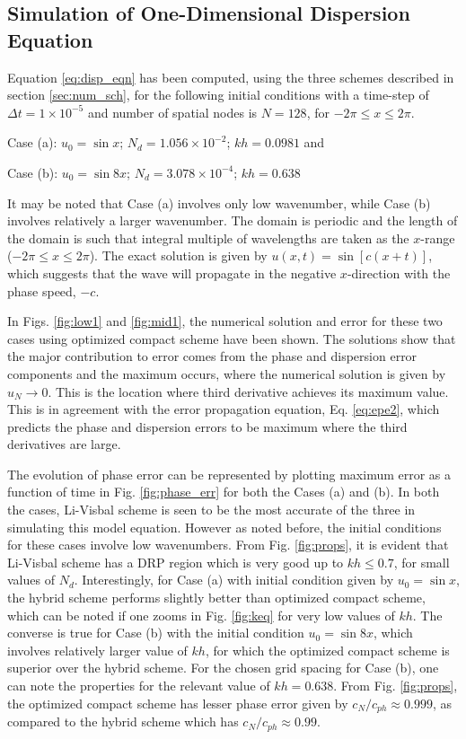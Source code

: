 \documentclass{svjour3}                    %
\begin{document}
\subsection{Simulation of One-Dimensional Dispersion Equation}
Equation \eqref{eq:disp_eqn} has been computed, using the three schemes described in section \ref{sec:num_sch}, for the following initial conditions with 
a time-step of $\Delta t =1 \times 10^{-5}$ and number of spatial nodes is $N=128$, for $-2\pi \leq x \leq 2\pi$.

Case (a): $u_0 = \sin x$; $N_d=1.056 \times 10^{-2}$; $kh=0.0981$\;\; and 

Case (b): $u_0 = \sin 8x$; $N_d=3.078 \times 10^{-4}$; $kh=0.638$



It may be noted that Case (a) involves only low wavenumber, while Case (b) involves relatively a larger wavenumber. The domain is periodic 
and the length of the domain is such that integral multiple of wavelengths are taken as the $x$-range ($-2\pi \leq x \leq 2\pi$). The exact solution 
is given by $u(x,t)=\sin[c(x+t)]$, which suggests that the wave will propagate in the negative $x$-direction with the phase speed, $-c$. 

In Figs. \ref{fig:low1} and \ref{fig:mid1}, the numerical solution and error for these two cases using optimized compact scheme have been shown. The solutions show that the major contribution to error comes from the phase and dispersion error components and the maximum occurs, where the numerical solution is given by $u_N \to 0$. This is the location where third derivative achieves its maximum value. This is in agreement with the error 
propagation equation, Eq. \eqref{eq:epe2}, which predicts the phase and dispersion errors to be maximum where the third derivatives are large.

The evolution of phase error can be represented by plotting maximum error as a function of time in Fig. \ref{fig:phase_err} for both the Cases (a) and
(b). In both the cases, Li-Visbal scheme is seen to be the most accurate of the three in simulating this model equation. However as noted before, the initial conditions for these cases involve low wavenumbers. From Fig. \ref{fig:props}, it is evident that Li-Visbal scheme has a DRP region which is 
very good up to $kh \leq 0.7$, for small values of $N_d$. Interestingly, for Case (a) with initial condition given by $u_0 = \sin x$, the hybrid scheme performs slightly better than optimized compact scheme, which can be noted if one zooms in Fig. \ref{fig:keq} for very low values of $kh$. The converse 
is true for Case (b) with the initial condition $u_0 = \sin 8x$, which involves relatively larger value of $kh$, for which the optimized compact scheme 
is superior over the hybrid scheme. For the chosen grid spacing for Case (b), one can note the properties for the relevant value of $kh=0.638$. From 
Fig. \ref{fig:props}, the optimized compact scheme has lesser phase error given by $c_N/c_{ph} \approx 0.999$, as compared to the hybrid scheme which 
has $c_N/c_{ph} \approx 0.99$.
\end{document}
